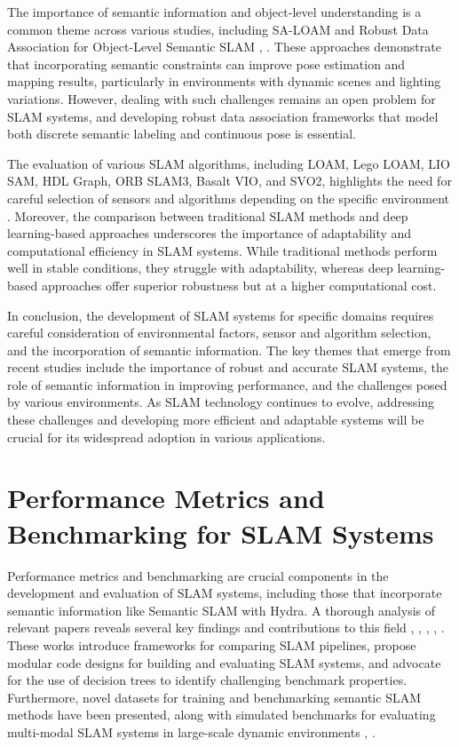 \documentclass[conference]{IEEEtran}
\begin{document}
The importance of semantic information and object-level understanding is a common theme across various studies, including SA-LOAM and Robust Data Association for Object-Level Semantic SLAM \cite{b2}, \cite{b4}. These approaches demonstrate that incorporating semantic constraints can improve pose estimation and mapping results, particularly in environments with dynamic scenes and lighting variations. However, dealing with such challenges remains an open problem for SLAM systems, and developing robust data association frameworks that model both discrete semantic labeling and continuous pose is essential.

The evaluation of various SLAM algorithms, including LOAM, Lego LOAM, LIO SAM, HDL Graph, ORB SLAM3, Basalt VIO, and SVO2, highlights the need for careful selection of sensors and algorithms depending on the specific environment \cite{b1}. Moreover, the comparison between traditional SLAM methods and deep learning-based approaches underscores the importance of adaptability and computational efficiency in SLAM systems. While traditional methods perform well in stable conditions, they struggle with adaptability, whereas deep learning-based approaches offer superior robustness but at a higher computational cost.

In conclusion, the development of SLAM systems for specific domains requires careful consideration of environmental factors, sensor and algorithm selection, and the incorporation of semantic information. The key themes that emerge from recent studies include the importance of robust and accurate SLAM systems, the role of semantic information in improving performance, and the challenges posed by various environments. As SLAM technology continues to evolve, addressing these challenges and developing more efficient and adaptable systems will be crucial for its widespread adoption in various applications.

\section{Performance Metrics and Benchmarking for SLAM Systems}
Performance metrics and benchmarking are crucial components in the development and evaluation of SLAM systems, including those that incorporate semantic information like Semantic SLAM with Hydra. A thorough analysis of relevant papers reveals several key findings and contributions to this field \cite{b1}, \cite{b2}, \cite{b3}, \cite{b4}, \cite{b5}. These works introduce frameworks for comparing SLAM pipelines, propose modular code designs for building and evaluating SLAM systems, and advocate for the use of decision trees to identify challenging benchmark properties. Furthermore, novel datasets for training and benchmarking semantic SLAM methods have been presented, along with simulated benchmarks for evaluating multi-modal SLAM systems in large-scale dynamic environments \cite{b4}, \cite{b5}.
\end{document}
